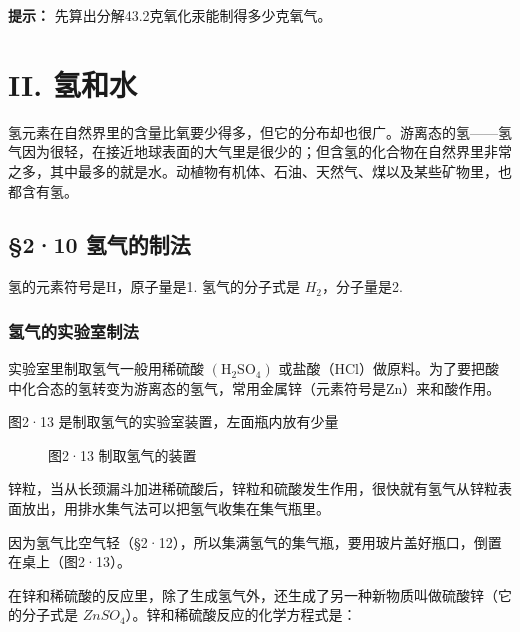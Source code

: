 \begin{shulihuadef}
\textbf{提示：} 先算出分解43.2克氧化汞能制得多少克氧气。
\end{shulihuadef}

\section{II. 氢和水}\label{ii.-ux6c22ux548cux6c34}

氢元素在自然界里的含量比氧要少得多，但它的分布却也很广。游离态的氢------氢气因为很轻，在接近地球表面的大气里是很少的；但含氢的化合物在自然界里非常之多，其中最多的就是水。动植物有机体、石油、天然气、煤以及某些矿物里，也都含有氢。

\subsection{§2·10 氢气的制法}

氢的元素符号是H，原子量是1. 氢气的分子式是 \(H_{2}\)，分子量是2.

\subsubsection{氢气的实验室制法}

实验室里制取氢气一般用稀硫酸
\(\left(\mathrm{H}_{2}\mathrm{SO}_{4}\right)\)
或盐酸（HCl）做原料。为了要把酸中化合态的氢转变为游离态的氢气，常用金属锌（元素符号是Zn）来和酸作用。

图2·13 是制取氢气的实验室装置，左面瓶内放有少量

\begin{figure}
\centering
\caption{图2·13 制取氢气的装置}
\end{figure}

锌粒，当从长颈漏斗加进稀硫酸后，锌粒和硫酸发生作用，很快就有氢气从锌粒表面放出，用排水集气法可以把氢气收集在集气瓶里。

因为氢气比空气轻（§2·12），所以集满氢气的集气瓶，要用玻片盖好瓶口，倒置在桌上（图2·13）。

在锌和稀硫酸的反应里，除了生成氢气外，还生成了另一种新物质叫做硫酸锌（它的分子式是
\(ZnSO_{4}\)）。锌和稀硫酸反应的化学方程式是：

